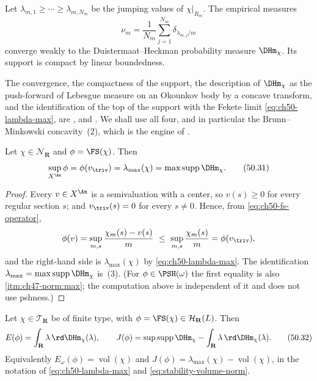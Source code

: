Let $\lambda_{m,1}\geq\cdots\geq\lambda_{m,N_m}$ be the jumping values of
$\chi|_{R_m}$.  The empirical measures
\[
             \nu_m=\frac1{N_m}\sum_{j=1}^{N_m}
                    \delta_{\lambda_{m,j}/m}
\tag{50.30}\label{eq:stability-empirical-dh}
\]
converge weakly to the Duistermaat--Heckman probability measure
$\DHm_\chi$.  Its support is compact by linear boundedness.

The convergence, the compactness of the support, the description of
$\DHm_\chi$ as the push-forward of Lebesgue measure on an Okounkov body
by a concave transform, and the identification of the top of the support
with the Fekete limit \eqref{eq:ch50-lambda-max}, are
,  and
.  We shall use all four, and in particular the
Brunn--Minkowski concavity
\,(2), which is the engine of
.

\begin{proposition}
\label{prop:ch50-sup-lambdamax}
Let $\chi\in\mathcal N_{\mathbf R}$ and $\phi=\FS(\chi)$.  Then
\[
 \sup_{X^{\An}}\phi=\phi(v_{\triv})
 =\lambda_{\max}(\chi)
 =\max\operatorname{supp}\DHm_\chi .
\tag{50.31}\label{eq:ch50-sup-lambdamax}
\]
\end{proposition}

\begin{proof}
Every $v\in X^{\An}$ is a semivaluation with a center, so
$v(s)\ge0$ for every regular section $s$; and
$v_{\triv}(s)=0$ for every $s\ne0$.  Hence, from
\eqref{eq:ch50-fs-operator},
\[
 \phi(v)=\sup_{m,s}\frac{\chi_m(s)-v(s)}{m}
 \ \le\ \sup_{m,s}\frac{\chi_m(s)}{m}
 =\phi(v_{\triv}),
\]
and the right-hand side is $\lambda_{\max}(\chi)$ by
\eqref{eq:ch50-lambda-max}.  The identification
$\lambda_{\max}=\max\operatorname{supp}\DHm_\chi$ is
\,(3).  (For $\phi\in\PSH(\omega)$ the first
equality is also \,\cref{itm:ch47-norm:max};
the computation above is independent of it and does not use pshness.)
\end{proof}

\begin{theorem}
\label{thm:ch50-energy-dh}
Let $\chi\in\mathcal T_{\mathbf R}$ be of finite type, with
$\phi=\FS(\chi)\in\mathcal H_{\mathbf R}(L)$.  Then
\[
 E(\phi)=\int_{\mathbf R}\lambda\,\rd \DHm_\chi(\lambda),
\qquad
 J(\phi)=\sup\operatorname{supp}\DHm_\chi
                  -\int_{\mathbf R}\lambda\,\rd \DHm_\chi(\lambda).
\tag{50.32}\label{eq:stability-dh-energy-J}
\]
Equivalently $E_\omega(\phi)=\operatorname{vol}(\chi)$ and
$J(\phi)=\lambda_{\max}(\chi)-\operatorname{vol}(\chi)$, in the notation
of \eqref{eq:ch50-lambda-max} and \eqref{eq:stability-volume-norm}.
\end{theorem}

